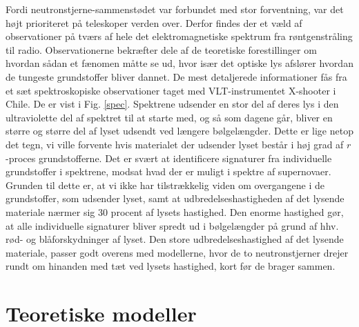 \documentclass[twocolumn]{article}
\begin{document}
Fordi neutronstjerne-sammenstødet var forbundet med stor forventning, var det højt prioriteret på teleskoper verden over. Derfor findes der et væld af observationer på tværs af hele det elektromagnetiske spektrum fra røntgenstråling til radio. Observationerne bekræfter dele af de teoretiske forestillinger om hvordan sådan et fænomen måtte se ud, hvor især det optiske lys afslører hvordan de tungeste grundstoffer bliver dannet. De mest detaljerede informationer fås fra et sæt spektroskopiske observationer taget med VLT-instrumentet X-shooter i Chile. De er vist i Fig. \ref{spec}. Spektrene udsender en stor del af deres lys i den ultraviolette del af spektret til at starte med, og så som dagene går, bliver en større og større del af lyset udsendt ved længere bølgelængder. Dette er lige netop det tegn, vi ville forvente hvis materialet der udsender lyset består i høj grad af $r$-proces grundstofferne. Det er svært at identificere signaturer fra individuelle grundstoffer i spektrene, modsat hvad der er muligt i spektre af supernovaer. Grunden til dette er, at vi ikke har tilstrækkelig viden om overgangene i de grundstoffer, som udsender lyset, samt at udbredelseshastigheden af det lysende materiale nærmer sig 30 procent af lysets hastighed. Den enorme hastighed gør, at alle individuelle signaturer bliver spredt ud i bølgelængder på grund af hhv. rød- og blåforskydninger af lyset. Den store udbredelseshastighed af det lysende materiale, passer godt overens med modellerne, hvor de to neutronstjerner drejer rundt om hinanden med tæt ved lysets hastighed, kort før de brager sammen. 


\section{Teoretiske modeller}\label{teo}
\end{document}
